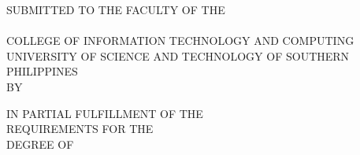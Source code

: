\newcommand{\citcAbstract}{%
\placeholder{Abstract}{Between 150 and 250 words in one continuous paragraph:
the research problem, the objective, the methods, the results, the conclusion.}
}

\newcommand{\citcKeywords}{text-to-speech, flow matching, knowledge
  distillation, adaptive inference, risk control}


\newcommand{\citcPrelimPage}[1]{%
  \clearpage\thispagestyle{prelim}%
  \begin{center}\textbf{\MakeUppercase{#1}}\end{center}%
  \vspace{3\baselineskip}%
}

\clearpage
{}
\setcounter{page}{1}

\thispagestyle{empty}
\begin{center}
\bfseries
\citcTitle

\vspace{5\baselineskip}
SUBMITTED TO THE FACULTY OF THE\\
\citcDepartment\\
COLLEGE OF INFORMATION TECHNOLOGY AND COMPUTING\\
UNIVERSITY OF SCIENCE AND TECHNOLOGY OF SOUTHERN PHILIPPINES\\
BY

\vspace{3\baselineskip}
\citcAuthors

\vspace{3\baselineskip}
IN PARTIAL FULFILLMENT OF THE\\
REQUIREMENTS FOR THE\\
DEGREE OF

\vspace{3\baselineskip}
\citcDegree

\vspace{3\baselineskip}
\citcSubmissionDate
\end{center}

